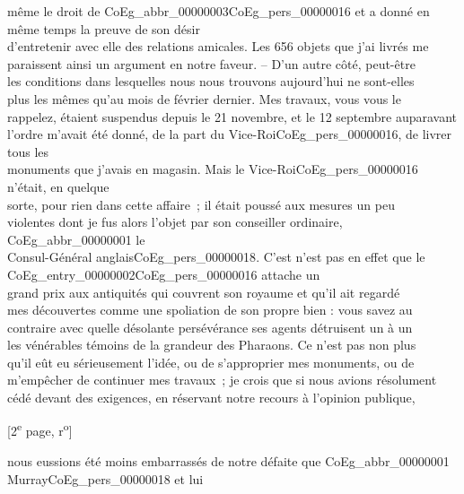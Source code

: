 \documentclass{book}
\begin{document}
même le droit de \gls{CoEg_abbr_00000003}\gls{CoEg_pers_00000016} et a donné en même temps la preuve de son désir\\
d’entretenir avec elle des relations amicales. Les 656 objets que j’ai livrés me\\
paraissent ainsi un argument en notre faveur. – D’un autre côté, peut-être\\
les conditions dans lesquelles nous nous trouvons aujourd’hui ne sont-elles\\
plus les mêmes qu’au mois de février dernier. Mes travaux, vous vous le\\
rappelez, étaient suspendus depuis le 21 novembre, et le 12 septembre auparavant\\
l’ordre m’avait été donné, de la part du Vice-Roi\gls{CoEg_pers_00000016}, de livrer tous les\\
monuments que j’avais en magasin. Mais le Vice-Roi\gls{CoEg_pers_00000016} n’était, en quelque\\
sorte, pour rien dans cette affaire~; il était poussé aux mesures un peu\\
violentes dont je fus alors l’objet par son conseiller ordinaire, \gls{CoEg_abbr_00000001} le\\
Consul-Général anglais\gls{CoEg_pers_00000018}. C’est n’est pas en effet que le \gls{CoEg_entry_00000002}\gls{CoEg_pers_00000016} attache un\\
grand prix aux antiquités qui couvrent son royaume et qu’il ait regardé\\
mes découvertes comme une spoliation de son propre bien : vous savez au\\
contraire avec quelle désolante persévérance ses agents détruisent un à un\\
les vénérables témoins de la grandeur des Pharaons. Ce n’est pas non plus\\
qu’il eût eu sérieusement l’idée, ou de s’approprier mes monuments, ou de\\
m’empêcher de continuer mes travaux~; je crois que si nous avions résolument\\
cédé devant des exigences, en réservant notre recours à l’opinion publique,\\
{\footnotesize \begin{center} {[2\textsuperscript{e} page, r\textsuperscript{o}]}\end{center}}
\noindent nous eussions été moins embarrassés de notre défaite que \gls{CoEg_abbr_00000001} Murray\gls{CoEg_pers_00000018} et lui\\
\end{document}
